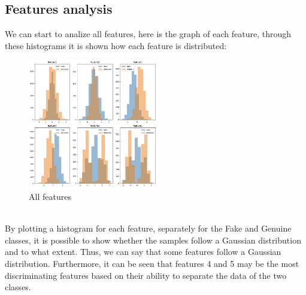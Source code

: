 \documentclass{article}
\begin{document}
\subsection{Features analysis}
We can start to analize all features, here is the graph of each feature, through these histograms it is shown how each feature is distributed:\\
\begin{figure}[ht]
        \centering
        \includegraphics[width=0.5\textwidth]{./img/AllFeatures.png}
        \caption{All features}
        \label{fig:AllFeatures}
\end{figure}  
\\
By plotting a histogram for each feature, separately for the Fake and Genuine classes, it is possible to show whether the samples follow a Gaussian distribution and to what extent. 
Thus, we can say that some features follow a Gaussian distribution. Furthermore, it can be seen that features 4 and 5 may be the most discriminating features based on their ability to separate the data of the two classes.\\
\end{document}
